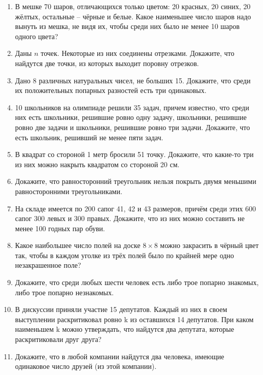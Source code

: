 \documentclass{article}
\begin{document}
\begin{enumerate}[label*=\protect\fbox{\arabic{enumi}}]
		\item В мешке 70 шаров, отличающихся только цветом: 20 красных, 20 синих, 20 жёлтых, остальные – чёрные и белые. 
		Какое наименьшее число шаров надо вынуть из мешка, не видя их, чтобы среди них было не менее 10 шаров одного цвета?
		
		\item Даны $n$ точек. Некоторые из них соединены отрезками. Докажите, что найдутся две точки, из которых выходит поровну отрезков.
		
		\item Дано 8 различных натуральных чисел, не больших 15. Докажите, что среди их положительных попарных разностей есть три одинаковых.
		
		\item 10 школьников на олимпиаде решили 35 задач, причем известно, что среди них есть школьники, решившие ровно одну задачу, школьники, решившие ровно две задачи и школьники, решившие ровно три задачи. Докажите, что есть школьник, решивший не менее пяти задач.
		
		\item В квадрат со стороной 1 метр бросили 51 точку. Докажите, что какие-то три из них можно накрыть квадратом со стороной 20 см.
		
		\item Докажите, что равносторонний треугольник нельзя покрыть двумя меньшими равносторонними треугольниками.
		
		\item На складе имеется по 200 сапог 41, 42 и 43 размеров, причём среди этих 600 сапог 300 левых и 300 правых.
		Докажите, что из них можно составить не менее 100 годных пар обуви.
		
		\item Какое наибольшее число полей на доске $8 \times 8$ можно закрасить в чёрный цвет так, чтобы в каждом уголке из трёх полей было по крайней мере одно незакрашенное поле? 
		
		\item Докажите, что среди любых шести человек есть либо трое попарно знакомых, либо трое попарно незнакомых.
		
		\item В дискуссии приняли участие 15 депутатов. Каждый из них в своем выступлении раскритиковал ровно k из оставшихся 14 депутатов. При каком наименьшем k можно утверждать, что найдутся два депутата, которые раскритиковали друг друга?
		
		\item Докажите, что в любой компании найдутся два человека, имеющие одинаковое число друзей (из этой компании).
		

\end{enumerate}
\end{document}
